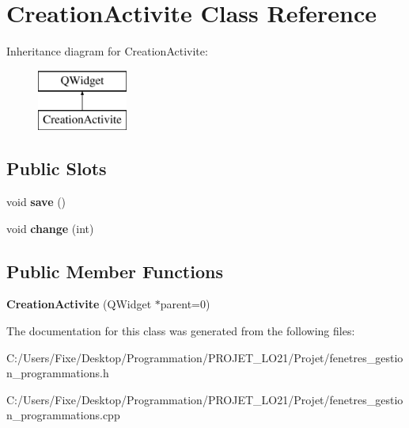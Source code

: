 \hypertarget{class_creation_activite}{}\section{Creation\+Activite Class Reference}
\label{class_creation_activite}
Inheritance diagram for Creation\+Activite\+:\begin{figure}[H]
\begin{center}
\leavevmode
\includegraphics[height=2.000000cm]{class_creation_activite}
\end{center}
\end{figure}
\subsection*{Public Slots}
\begin{DoxyCompactItemize}
\item 
\hypertarget{class_creation_activite_ade782bc7799e1e5806887adfa4607234}{}void {\bfseries save} ()\label{class_creation_activite_ade782bc7799e1e5806887adfa4607234}

\item 
\hypertarget{class_creation_activite_afeb53f5c67ad3cdb5a4f71e911095664}{}void {\bfseries change} (int)\label{class_creation_activite_afeb53f5c67ad3cdb5a4f71e911095664}

\end{DoxyCompactItemize}
\subsection*{Public Member Functions}
\begin{DoxyCompactItemize}
\item 
\hypertarget{class_creation_activite_ac2c414b8dbc4b71ebcc7f4ad517d6660}{}{\bfseries Creation\+Activite} (Q\+Widget $\ast$parent=0)\label{class_creation_activite_ac2c414b8dbc4b71ebcc7f4ad517d6660}

\end{DoxyCompactItemize}


The documentation for this class was generated from the following files\+:\begin{DoxyCompactItemize}
\item 
C\+:/\+Users/\+Fixe/\+Desktop/\+Programmation/\+P\+R\+O\+J\+E\+T\+\_\+\+L\+O21/\+Projet/fenetres\+\_\+gestion\+\_\+programmations.\+h\item 
C\+:/\+Users/\+Fixe/\+Desktop/\+Programmation/\+P\+R\+O\+J\+E\+T\+\_\+\+L\+O21/\+Projet/fenetres\+\_\+gestion\+\_\+programmations.\+cpp\end{DoxyCompactItemize}
